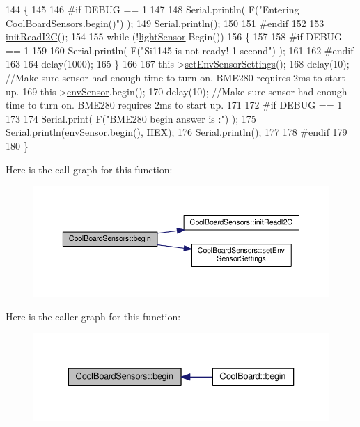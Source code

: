 \begin{DoxyCode}
144 \{  
145 
146 \textcolor{preprocessor}{#if DEBUG == 1 }
147      
148     Serial.println( F(\textcolor{stringliteral}{"Entering CoolBoardSensors.begin()"}) );
149     Serial.println();
150 
151 \textcolor{preprocessor}{#endif}
152 
153     \hyperlink{classCoolBoardSensors_acad6a8418c66d36868caca23c844ecb6}{initReadI2C}();
154 
155     \textcolor{keywordflow}{while} (!\hyperlink{classCoolBoardSensors_a3e397300fb707dd193e909a757bf6102}{lightSensor}.Begin()) 
156     \{
157     
158 \textcolor{preprocessor}{    #if DEBUG == 1}
159 
160         Serial.println( F(\textcolor{stringliteral}{"Si1145 is not ready!  1 second"}) );
161 
162 \textcolor{preprocessor}{    #endif}
163 
164         delay(1000);
165     \}
166      
167     this->\hyperlink{classCoolBoardSensors_a406307ffd70272282d91479c7ed8d66f}{setEnvSensorSettings}();
168     delay(10);  \textcolor{comment}{//Make sure sensor had enough time to turn on. BME280 requires 2ms to start up.}
169     this->\hyperlink{classCoolBoardSensors_a868e38985e9a2412829fa2790ca13e2e}{envSensor}.begin();
170     delay(10);  \textcolor{comment}{//Make sure sensor had enough time to turn on. BME280 requires 2ms to start up.}
171 
172 \textcolor{preprocessor}{#if DEBUG == 1 }
173     
174     Serial.print( F(\textcolor{stringliteral}{"BME280 begin answer is :"}) );
175     Serial.println(\hyperlink{classCoolBoardSensors_a868e38985e9a2412829fa2790ca13e2e}{envSensor}.begin(), HEX);
176     Serial.println();
177 
178 \textcolor{preprocessor}{#endif}
179 
180 \}
\end{DoxyCode}
Here is the call graph for this function\+:\nopagebreak
\begin{figure}[H]
\begin{center}
\leavevmode
\includegraphics[width=350pt]{classCoolBoardSensors_a97095823ef7c8f5290812f1405b966b3_cgraph}
\end{center}
\end{figure}
Here is the caller graph for this function\+:\nopagebreak
\begin{figure}[H]
\begin{center}
\leavevmode
\includegraphics[width=336pt]{classCoolBoardSensors_a97095823ef7c8f5290812f1405b966b3_icgraph}
\end{center}
\end{figure}
